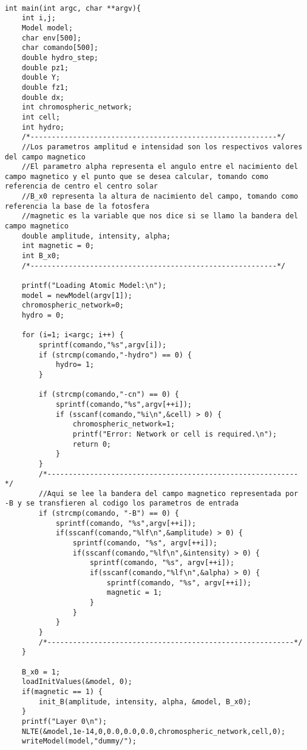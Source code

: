 \begin{lstlisting}[style=CStyle]

int main(int argc, char **argv){
	int i,j;
	Model model;
	char env[500];
	char comando[500];
	double hydro_step;
	double pz1;
	double Y;
	double fz1;
	double dx;
	int chromospheric_network;
	int cell;
	int hydro;
	/*----------------------------------------------------------*/
	//Los parametros amplitud e intensidad son los respectivos valores del campo magnetico
	//El parametro alpha representa el angulo entre el nacimiento del campo magnetico y el punto que se desea calcular, tomando como referencia de centro el centro solar
	//B_x0 representa la altura de nacimiento del campo, tomando como referencia la base de la fotosfera
	//magnetic es la variable que nos dice si se llamo la bandera del campo magnetico
	double amplitude, intensity, alpha;
	int magnetic = 0;
	int B_x0;
	/*----------------------------------------------------------*/

	printf("Loading Atomic Model:\n");
	model = newModel(argv[1]);
	chromospheric_network=0;
	hydro = 0;

	for (i=1; i<argc; i++) {
		sprintf(comando,"%s",argv[i]);
		if (strcmp(comando,"-hydro") == 0) {
			hydro= 1;
		}

		if (strcmp(comando,"-cn") == 0) {
			sprintf(comando,"%s",argv[++i]);
			if (sscanf(comando,"%i\n",&cell) > 0) {
				chromospheric_network=1;
				printf("Error: Network or cell is required.\n");
				return 0;
			}
		}
		/*-----------------------------------------------------------*/	
		//Aqui se lee la bandera del campo magnetico representada por -B y se transfieren al codigo los parametros de entrada
		if (strcmp(comando, "-B") == 0) {
			sprintf(comando, "%s",argv[++i]);
			if(sscanf(comando,"%lf\n",&amplitude) > 0) {
				sprintf(comando, "%s", argv[++i]);
				if(sscanf(comando,"%lf\n",&intensity) > 0) {
					sprintf(comando, "%s", argv[++i]);
					if(sscanf(comando,"%lf\n",&alpha) > 0) {
						sprintf(comando, "%s", argv[++i]);
						magnetic = 1;
					}
				}
			}
		}
		/*----------------------------------------------------------*/	
	}

	B_x0 = 1;
	loadInitValues(&model, 0);
	if(magnetic == 1) {
		init_B(amplitude, intensity, alpha, &model, B_x0);
	}
	printf("Layer 0\n");
	NLTE(&model,1e-14,0,0.0,0.0,0.0,chromospheric_network,cell,0);
	writeModel(model,"dummy/");


\end{lstlisting}
